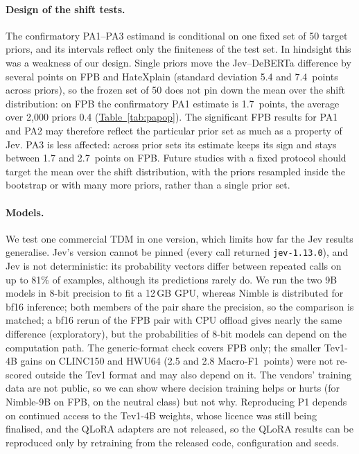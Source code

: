 \paragraph{Design of the shift tests.}
The confirmatory PA1--PA3 estimand is conditional on one fixed set of 50 target priors, and its intervals reflect only
the finiteness of the test set. In hindsight this was a weakness of our design. Single priors move the Jev--DeBERTa
difference by several points on FPB and HateXplain (standard deviation 5.4 and 7.4~points across priors), so the frozen
set of 50 does not pin down the mean over the shift distribution: on FPB the confirmatory PA1 estimate is 1.7~points,
the average over 2{,}000 priors 0.4 (\hyperref[tab:papop]{Table~\ref*{tab:papop}}). The significant FPB results for PA1 and PA2 may therefore
reflect the particular prior set as much as a property of Jev. PA3 is less affected: across prior sets its estimate keeps
its sign and stays between 1.7 and 2.7~points on FPB. Future studies with a fixed protocol should target the mean over the shift
distribution, with the priors resampled inside the bootstrap or with many more priors, rather than a single prior set.

\paragraph{Models.}
We test one commercial TDM in one version, which limits how far the Jev results generalise. Jev's version cannot
be pinned (every call returned \texttt{jev-1.13.0}), and Jev is not deterministic: its probability
vectors differ between repeated calls on up to 81\% of examples, although its predictions rarely do. We run the two 9B
models in 8-bit precision to fit a 12\,GB GPU, whereas Nimble is distributed for bf16 inference; both members of the pair
share the precision, so the comparison is matched; a bf16 rerun of the FPB pair with CPU offload gives nearly the
same difference (exploratory), but the probabilities of 8-bit models can depend on the computation path. The
generic-format check covers FPB only; the smaller Tev1-4B gains on CLINC150 and HWU64 (2.5 and 2.8 Macro-F1~points)
were not re-scored outside the Tev1 format and may also depend on it. The vendors' training
data are not public, so we can show where decision training helps or hurts (for Nimble-9B on FPB, on the neutral class)
but not why. Reproducing P1 depends on continued access to the Tev1-4B weights, whose licence was still being
finalised, and the QLoRA adapters are not released, so the QLoRA results can be reproduced only by retraining from the
released code, configuration and seeds.

